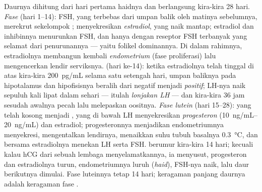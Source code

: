 \begin{definition}\label{def:b2:reproductive-hormones:cycle}
%
Daurnya dihitung dari hari pertama haidnya dan berlangsung kira-kira 28
hari. \emph{Fase } (hari 1--14): FSH, yang terbebas dari umpan
balik oleh matinya  sebelumnya, merekrut sekelompok
;  menyekresikan \emph{estradiol}, yang naik mantap;
estradiol dan inhibinnya menurunkan FSH, dan hanya  dengan
reseptor FSH terbanyak yang selamat dari penurunannya --- yaitu folikel
dominannya. Di dalam rahimnya, estradiolnya membangun kembali
\emph{endometrium} (fase proliferasi) lalu mengencerkan lendir
serviksnya. \emph{} (hari ke-14): ketika estradiolnya telah
tinggal di atas kira-kira \qty{200}{pg/mL} selama satu setengah hari,
umpan baliknya pada hipotalamus dan hipofisisnya beralih dari negatif
menjadi \emph{positif}; LH-nya naik sepuluh kali lipat dalam sehari ---
itulah \emph{lonjakan LH} --- dan kira-kira 36 jam sesudah awalnya
 pecah lalu melepaskan oositnya. \emph{Fase lutein} (hari
15--28):  yang telah kosong menjadi , yang di bawah
LH menyekresikan \emph{progesteron} (\qtyrange{10}{20}{ng/mL}) dan
estradiol; progesteronnya menjadikan endometriumnya menyekresi,
mengentalkan lendirnya, menaikkan suhu tubuh basalnya
\qty{0.3}{\celsius}, dan bersama estradiolnya menekan LH serta FSH.
 berumur kira-kira 14 hari; kecuali kalau hCG dari
sebuah lembaga menyelamatkannya, ia menyusut, progesteron dan
estradiolnya turun, endometriumnya luruh (\emph{haid}), FSH-nya naik,
lalu daur berikutnya dimulai. Fase luteinnya tetap 14 hari; keragaman
panjang daurnya adalah keragaman fase .
\end{definition}

